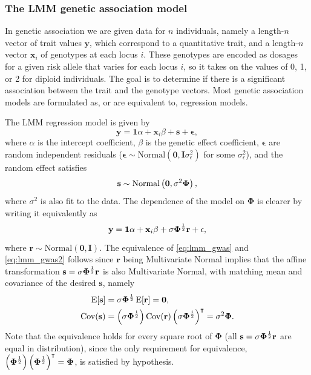 \documentclass[11pt]{article}
\newcommand{\kinMat}{%
  \ensuremath{%
    \mathbf{\Phi}
  }%
  \xspace%
}%
\begin{document}
\subsubsection{The LMM genetic association model}

In genetic association we are given data for $n$ individuals, namely a length-$n$ vector of trait values $\mathbf{y}$, which correspond to a quantitative trait, and a length-$n$ vector $\mathbf{x}_i$ of genotypes at each locus $i$.
These genotypes are encoded as dosages for a given risk allele that varies for each locus $i$, so it takes on the values of 0, 1, or 2 for diploid individuals.
The goal is to determine if there is a significant association between the trait and the genotype vectors.
Most genetic association models are formulated as, or are equivalent to, regression models.

The LMM regression model is given by
\begin{equation}
  \label{eq:lmm_gwas}
  \mathbf{y}
  =
  \mathbf{1} \alpha + \mathbf{x}_i \beta + \mathbf{s} + \mathbf{\epsilon}
  ,
\end{equation}
where $\alpha$ is the intercept coefficient,
$\beta$ is the genetic effect coefficient,
$\mathbf{\epsilon}$ are random independent residuals ($\mathbf{\epsilon} \sim \text{Normal}(\mathbf{0}, \mathbf{I} \sigma^2_\epsilon)$ for some $\sigma^2_\epsilon$),
and the random effect satisfies \citep{sul_population_2018}
$$
\mathbf{s} \sim \text{Normal} \left( \mathbf{0}, \sigma^2 \kinMat \right),
$$
where $\sigma^2$ is also fit to the data.
The dependence of the model on \kinMat is clearer by writing it equivalently as
\begin{equation}
  \label{eq:lmm_gwas2}
  \mathbf{y}
  =
  \mathbf{1} \alpha + \mathbf{x}_i \beta + \sigma \kinMat^\frac{1}{2} \mathbf{r} + \mathbf{\epsilon}
  ,
\end{equation}
where $\mathbf{r} \sim \text{Normal} \left( \mathbf{0}, \mathbf{I} \right)$.
The equivalence of \cref{eq:lmm_gwas} and \cref{eq:lmm_gwas2} follows since $\mathbf{r}$ being Multivariate Normal implies that the affine transformation $\mathbf{s} = \sigma \kinMat^\frac{1}{2} \mathbf{r}$ is also Multivariate Normal, with matching mean and covariance of the desired $\mathbf{s}$, namely
\begin{align*}
  \E[ \mathbf{s} ]
  &=
    \sigma \kinMat^\frac{1}{2} \E[ \mathbf{r} ]
    = \mathbf{0},
  \\
  \Cov( \mathbf{s} )
  &= \left( \sigma \kinMat^\frac{1}{2} \right) \Cov( \mathbf{r} ) \left( \sigma \kinMat^\frac{1}{2} \right)^\intercal
    = \sigma^2 \kinMat
    .
\end{align*}
Note that the equivalence holds for every square root of \kinMat (all $\mathbf{s} = \sigma \kinMat^\frac{1}{2} \mathbf{r}$ are equal in distribution), since the only requirement for equivalence,
$\left( \kinMat^\frac{1}{2} \right) \left( \kinMat^\frac{1}{2} \right)^\intercal = \kinMat$,
is satisfied by hypothesis.
\end{document}
